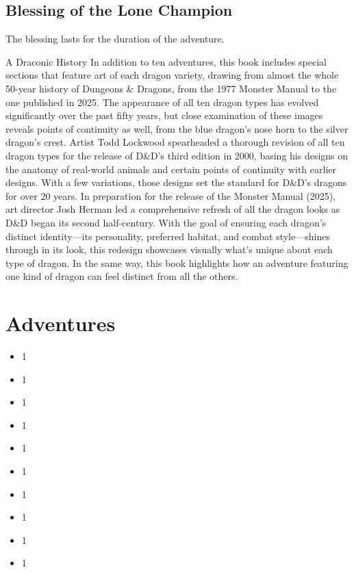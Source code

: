 \documentclass[letterpaper, 11pt, twocolumn]{dndbook}
\begin{document}
\subsection{Blessing of the Lone Champion}

The blessing lasts for the duration of the adventure.

\begin{DndSidebar}{A Draconic History}
In addition to ten adventures, this book includes special sections that feature art of each dragon variety, drawing from almost the whole 50-year history of Dungeons \& Dragons, from the 1977 Monster Manual to the one published in 2025. The appearance of all ten dragon types has evolved significantly over the past fifty years, but close examination of these images reveals points of continuity as well, from the blue dragon's nose horn to the silver dragon's crest.
Artist Todd Lockwood spearheaded a thorough revision of all ten dragon types for the release of D\&D's third edition in 2000, basing his designs on the anatomy of real-world animals and certain points of continuity with earlier designs. With a few variations, those designs set the standard for D\&D's dragons for over 20 years.
In preparation for the release of the Monster Manual (2025), art director Josh Herman led a comprehensive refresh of all the dragon looks as D\&D began its second half-century. With the goal of ensuring each dragon's distinct identity---its personality, preferred habitat, and combat style---shines through in its look, this redesign showcases visually what's unique about each type of dragon.
In the same way, this book highlights how an adventure featuring one kind of dragon can feel distinct from all the others.
\end{DndSidebar}
\section{Adventures}

\begin{itemize}
\item 1
\item 1
\item 1
\item 1
\item 1
\item 1
\item 1
\item 1
\item 1
\item 1
\end{itemize}
\end{document}
